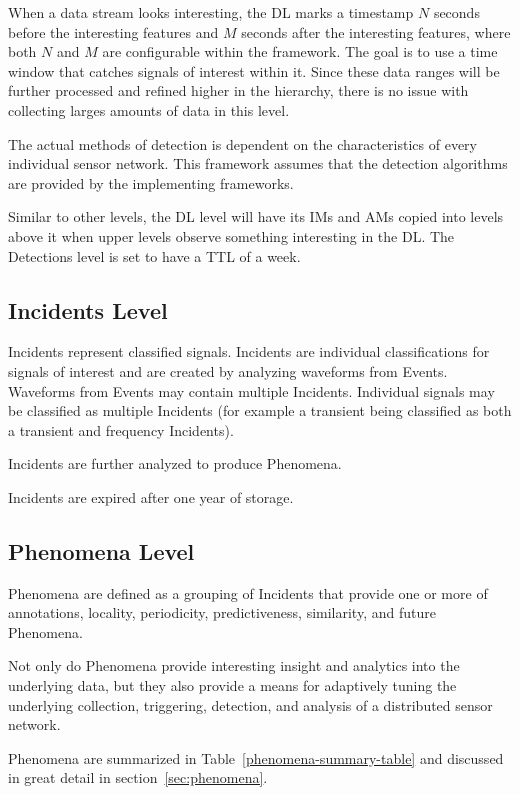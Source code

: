 When a data stream looks interesting, the DL marks a timestamp $N$ seconds before the interesting features and $M$ seconds after the interesting features, where both $N$ and $M$ are configurable within the framework. The goal is to use a time window that catches signals of interest within it. Since these data ranges will be further processed and refined higher in the hierarchy, there is no issue with collecting larges amounts of data in this level.

The actual methods of detection is dependent on the characteristics of every individual sensor network. This framework assumes that the detection algorithms are provided by the implementing frameworks.

Similar to other levels, the DL level will have its IMs and AMs copied into levels above it when upper levels observe something interesting in the DL. The Detections level is set to have a TTL of a week.

\subsection{Incidents Level}\label{subsec:incidents-level}
Incidents represent classified signals. Incidents are individual classifications for signals of interest and are created by analyzing waveforms from Events. Waveforms from Events may contain multiple Incidents. Individual signals may be classified as multiple Incidents (for example a transient being classified as both a transient and frequency Incidents).

Incidents are further analyzed to produce Phenomena.

Incidents are expired after one year of storage.

\subsection{Phenomena Level}\label{subsec:phenomena-level}
Phenomena are defined as a grouping of Incidents that provide one or more of annotations, locality, periodicity, predictiveness, similarity, and future Phenomena.

Not only do Phenomena provide interesting insight and analytics into the underlying data, but they also provide a means for adaptively tuning the underlying collection, triggering, detection, and analysis of a distributed sensor network.

Phenomena are summarized in Table~\ref{phenomena-summary-table} and discussed in great detail in section~\ref{sec:phenomena}.

